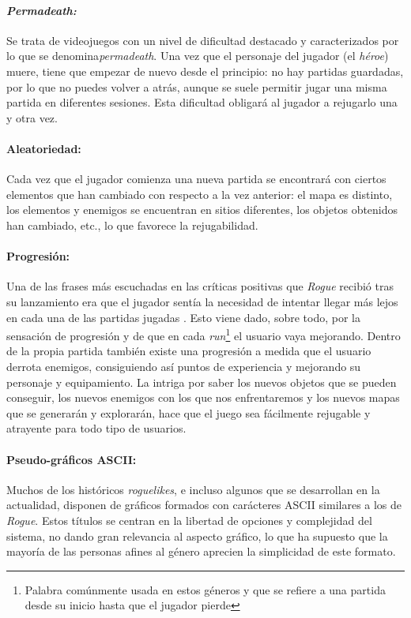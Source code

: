 \paragraph{\textit{Permadeath:}} Se trata de videojuegos con un nivel de dificultad destacado y caracterizados por lo que se denomina\textit{permadeath}. Una vez que el personaje del jugador (el \textit{héroe}) muere, tiene que empezar de nuevo desde el principio: no hay partidas guardadas, por lo que no puedes volver a atrás, aunque se suele permitir jugar una misma partida en diferentes sesiones. Esta dificultad obligará al jugador a rejugarlo una y otra vez.

\paragraph{Aleatoriedad:} Cada vez que el jugador comienza una nueva partida se encontrará con ciertos elementos que han cambiado con respecto a la vez anterior: el mapa es distinto, los elementos y enemigos se encuentran en sitios diferentes, los objetos obtenidos han cambiado, etc., lo que favorece la rejugabilidad.

\paragraph{Progresión:} Una de las frases más escuchadas en las críticas positivas que \textit{Rogue} recibió tras su lanzamiento era que el jugador sentía la necesidad de intentar llegar más lejos en cada una de las partidas jugadas \cite{website:machinesnetworks}. Esto viene dado, sobre todo, por la sensación de progresión y de que en cada \textit{run}\footnote{Palabra comúnmente usada en estos géneros y que se refiere a una partida desde su inicio hasta que el jugador pierde} el usuario vaya mejorando. Dentro de la propia partida también existe una progresión a medida que el usuario derrota enemigos, consiguiendo así puntos de experiencia y mejorando su personaje y equipamiento. La intriga por saber los nuevos objetos que se pueden conseguir, los nuevos enemigos con los que nos enfrentaremos y los nuevos mapas que se generarán y explorarán, hace que el juego sea fácilmente rejugable y atrayente para todo tipo de usuarios.

\paragraph{Pseudo-gráficos ASCII:} Muchos de los históricos \textit{roguelikes}, e incluso algunos que se desarrollan en la actualidad, disponen de gráficos formados con carácteres ASCII similares a los de \textit{Rogue}. Estos títulos se centran en la libertad de opciones y complejidad del sistema, no dando gran relevancia al aspecto gráfico, lo que ha supuesto que la mayoría de las personas afines al género aprecien la simplicidad de este formato.

